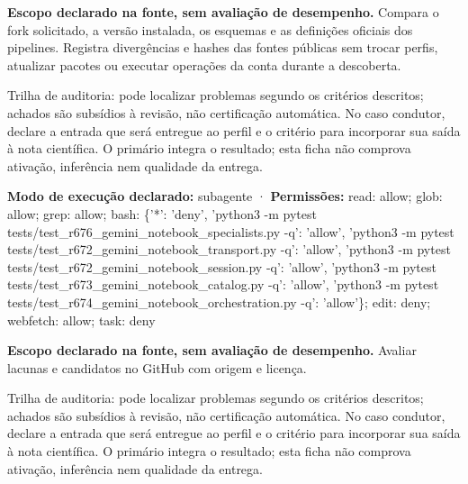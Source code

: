 
\begin{descricao}
\textbf{Escopo declarado na fonte, sem avaliação de desempenho.}
Compara o fork solicitado, a versão instalada, os esquemas e as definições oficiais dos pipelines. Registra divergências e hashes das fontes públicas sem trocar perfis, atualizar pacotes ou executar operações da conta durante a descoberta.
\end{descricao}

\begin{funcao}
Trilha de auditoria: pode localizar problemas segundo os critérios descritos; achados são subsídios à revisão, não certificação automática. No caso condutor, declare a entrada que será entregue ao perfil e o critério para incorporar sua saída à nota científica. O primário integra o resultado; esta ficha não comprova ativação, inferência nem qualidade da entrega.
\end{funcao}

\begin{arquitetura}
\textbf{Modo de execução declarado:} subagente · \textbf{Permissões:} read: allow; glob: allow; grep: allow; bash: \{'*': 'deny', 'python3 -m pytest tests/test\_r676\_gemini\_notebook\_specialists.py -q': 'allow', 'python3 -m pytest tests/test\_r672\_gemini\_notebook\_transport.py -q': 'allow', 'python3 -m pytest tests/test\_r672\_gemini\_notebook\_session.py -q': 'allow', 'python3 -m pytest tests/test\_r673\_gemini\_notebook\_catalog.py -q': 'allow', 'python3 -m pytest tests/test\_r674\_gemini\_notebook\_orchestration.py -q': 'allow'\}; edit: deny; webfetch: allow; task: deny
\end{arquitetura}


\begin{descricao}
\textbf{Escopo declarado na fonte, sem avaliação de desempenho.}
Avaliar lacunas e candidatos no GitHub com origem e licença.
\end{descricao}

\begin{funcao}
Trilha de auditoria: pode localizar problemas segundo os critérios descritos; achados são subsídios à revisão, não certificação automática. No caso condutor, declare a entrada que será entregue ao perfil e o critério para incorporar sua saída à nota científica. O primário integra o resultado; esta ficha não comprova ativação, inferência nem qualidade da entrega.
\end{funcao}

